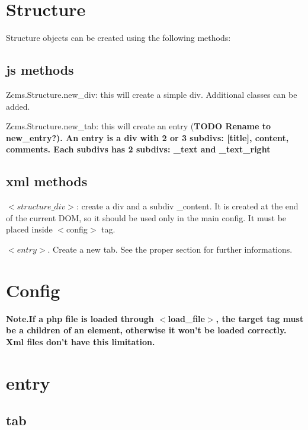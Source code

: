 \documentclass[a4paper,12pt]{article}
\begin{document}
\section{Structure}
Structure objects can be created using the following methods:
\subsection{js methods}
\begin{list}{-}{}
 \item Zcms.Structure.new\_div: this will create a simple div. Additional classes can be added.
\item Zcms.Structure.new\_tab: this will create an entry (\bfseries{TODO} \normalfont Rename to new\_entry?). An entry is a div with 2 or 3 subdivs: [title], content, comments. Each subdivs has 2 subdivs: \_text and \_text\_right
\end{list}
\subsection{xml methods}
\begin{list}{-}{}
  \item $<structure\_div>$: create a div and a subdiv \_content. It is created at the end of the current DOM, so it should be used only in the main config. It must be placed inside $<$config$>$ tag.
\item $<entry>$. Create a new tab. See the proper section for further informations.
\item 
\end{list}
\section{Config}
\bigskip
\bfseries{Note.}\normalfont If a php file is loaded through $<$load\_file$>$, the target tag must be a children of an element, otherwise it won't be loaded correctly. Xml files don't have this limitation.\\
\section{entry}
\subsection{tab}
\end{document}
